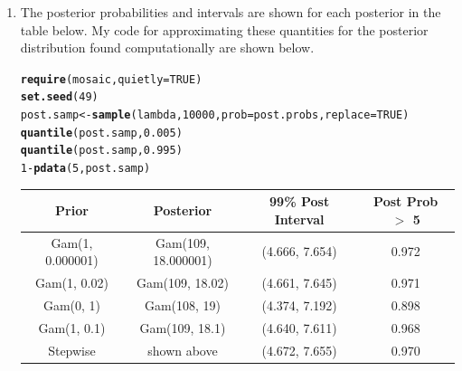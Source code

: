 \documentclass[11pt]{article}\usepackage[]{graphicx}\usepackage[]{color}
\makeatletter
\newcommand{\hlnum}[1]{\textcolor[rgb]{0.686,0.059,0.569}{#1}}%
\newcommand{\hlopt}[1]{\textcolor[rgb]{0,0,0}{#1}}%
\newcommand{\hlstd}[1]{\textcolor[rgb]{0.345,0.345,0.345}{#1}}%
\newcommand{\hlkwb}[1]{\textcolor[rgb]{0.69,0.353,0.396}{#1}}%
\newcommand{\hlkwc}[1]{\textcolor[rgb]{0.333,0.667,0.333}{#1}}%
\newcommand{\hlkwd}[1]{\textcolor[rgb]{0.737,0.353,0.396}{\textbf{#1}}}%
\newenvironment{kframe}{%
 \def\at@end@of@kframe{}%
 \ifinner\ifhmode%
  \def\at@end@of@kframe{\end{minipage}}%
  \begin{minipage}{\columnwidth}%
 \fi\fi%
 \def\FrameCommand##1{\hskip\@totalleftmargin \hskip-\fboxsep
 \colorbox{shadecolor}{##1}\hskip-\fboxsep
     \hskip-\linewidth \hskip-\@totalleftmargin \hskip\columnwidth}%
 \MakeFramed {\advance\hsize-\width
   \@totalleftmargin\z@ \linewidth\hsize
   \@setminipage}}%
 {\par\unskip\endMakeFramed%
 \at@end@of@kframe}
\newenvironment{knitrout}{}{} %
\makeatother
\begin{document}
\begin{doublespacing}
\begin{enumerate}
\begin{enumerate}
\begin{enumerate}
\end{enumerate}

\item The posterior probabilities and intervals are shown for each posterior in the table below. My code for approximating these quantities for the posterior distribution found computationally are shown below.



\begin{singlespace}
\begin{knitrout}\footnotesize
{}\color{fgcolor}\begin{kframe}
\begin{alltt}
\hlkwd{require}\hlstd{(mosaic,} \hlkwc{quietly}\hlstd{=}\hlnum{TRUE}\hlstd{)}
\hlkwd{set.seed}\hlstd{(}\hlnum{49}\hlstd{)}
\hlstd{post.samp} \hlkwb{<-} \hlkwd{sample}\hlstd{(lambda,} \hlnum{10000}\hlstd{,} \hlkwc{prob}\hlstd{=post.probs,} \hlkwc{replace}\hlstd{=}\hlnum{TRUE}\hlstd{)}
\hlkwd{quantile}\hlstd{(post.samp,} \hlnum{0.005}\hlstd{)}
\hlkwd{quantile}\hlstd{(post.samp,} \hlnum{0.995}\hlstd{)}
\hlnum{1}\hlopt{-}\hlkwd{pdata}\hlstd{(}\hlnum{5}\hlstd{, post.samp)}
\end{alltt}
\end{kframe}
\end{knitrout}
\end{singlespace}

\begin{table}[H]
\centering
\begin{tabular}{c|c|c|c}
Prior & Posterior & 99\% Post Interval & Post Prob $>$ 5 \\
\hline
Gam(1, 0.000001) & Gam(109, 18.000001) & (4.666, 7.654) & 0.972 \\
Gam(1, 0.02) & Gam(109, 18.02) & (4.661, 7.645) & 0.971 \\
Gam(0, 1) & Gam(108, 19) & (4.374, 7.192) & 0.898 \\
Gam(1, 0.1) & Gam(109, 18.1) & (4.640, 7.611) & 0.968 \\
Stepwise & shown above & (4.672, 7.655) & 0.970 \\
\hline
\end{tabular}
\end{table}


\end{enumerate}
\end{enumerate}
\end{doublespacing}
\end{document}
